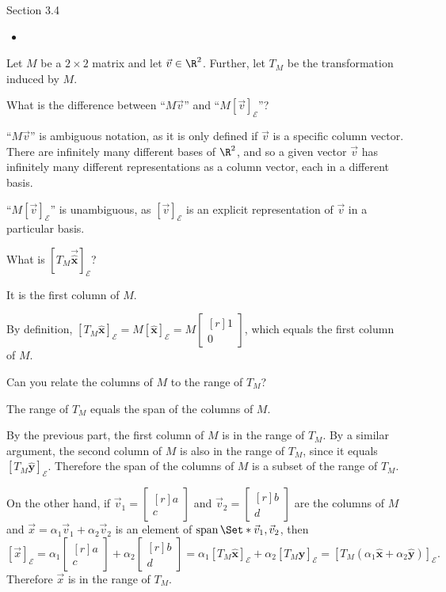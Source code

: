 \documentclass{problemset}
\DeclareMathOperator{\Span}{span}
\newcommand{\xhat}{{\hat {\mathbf x}}}
\newcommand{\yhat}{{\hat {\mathbf y}}}
\newcommand{\mat}[1]{\begin{bmatrix*}[r]#1\end{bmatrix*}}
\begin{document}
\begin{lesson}
	\newpage

	Section 3.4

	\begin{itemize}
		\item 
	\end{itemize}


	\newpage
\end{lesson}
	\question
	\label{inducedTransform}
	Let $M$ be a $2\times 2$ matrix and let $\vec v\in\R^2$. Further, let $T_M$
	be the transformation induced by $M$.
	\begin{parts}
		\item What is the difference between	
			``$M\vec v$'' and ``$M[\vec v]_{\mathcal E}$''?
			\begin{solution}
				``$M\vec v$'' is ambiguous notation, as it is only defined if
				$\vec v$ is a specific column vector. There are infinitely many
				different bases of $\R^2$, and so a given vector $\vec v$ has
				infinitely many different representations as a column vector,
				each in a different basis.

				``$M[\vec v]_{\mathcal E}$'' is unambiguous, as 
				$[\vec v]_{\mathcal E}$ is an explicit representation of $\vec v$
				in a particular basis. 
			\end{solution}
		\item What is $[T_M\vec \xhat]_{\mathcal E}$?
			\begin{solution}
				It is the first column of $M$. 

				By definition,
				$[T_M\xhat]_{\mathcal E}=M[\xhat]_{\mathcal E}=M\mat{1\\0}$,
				which equals the first column of $M$. 
			\end{solution}
		\item \label{inducedTransform.3} 
			Can you relate the columns of $M$ to the range of $T_M$?
			\begin{solution}
				The range of $T_M$ equals the span of the columns of $M$. 

				By the previous part, the first column of $M$ is in the range of
				$T_M$. By a similar argument, the second column of $M$ is also
				in the range of $T_M$, since it equals $[T_M\yhat]_{\mathcal E}$.
				Therefore the span of the columns of $M$ is a subset of the range
				of $T_M$. 

				On the other hand, if $\vec v_1=\mat{a\\c}$ and $\vec v_2=\mat{b\\d}$
				are the columns of $M$ and $\vec x = \alpha_1\vec v_1+\alpha_2\vec v_2$
				is an element of $\Span\Set*{\vec v_1,\vec v_2}$, then 
				\[
					[\vec x]_{\mathcal E}
					=\alpha_1\mat{a\\c}+\alpha_2\mat{b\\d}
					=\alpha_1[T_M\xhat]_{\mathcal E}+\alpha_2[T_M\yhat]_{\mathcal E}
					=[T_M(\alpha_1\xhat+\alpha_2\yhat)]_{\mathcal E}.
				\]
				Therefore $\vec x$ is in the range of $T_M$.
			\end{solution}
	\end{parts}
\end{document}
